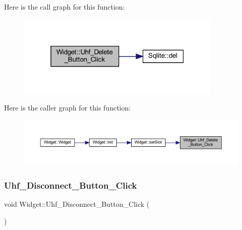 Here is the call graph for this function\+:
\nopagebreak
\begin{figure}[H]
\begin{center}
\leavevmode
\includegraphics[width=277pt]{class_widget_a6ef0cb76aab26c216bdd0584d32bdd1d_cgraph}
\end{center}
\end{figure}
Here is the caller graph for this function\+:
\nopagebreak
\begin{figure}[H]
\begin{center}
\leavevmode
\includegraphics[width=350pt]{class_widget_a6ef0cb76aab26c216bdd0584d32bdd1d_icgraph}
\end{center}
\end{figure}
\mbox{\label{class_widget_a0186f9125495a90a0166280d932ae831}} 
\subsubsection{\texorpdfstring{Uhf\_Disconnect\_Button\_Click}{Uhf\_Disconnect\_Button\_Click}}
{\footnotesize\ttfamily void Widget\+::\+Uhf\+\_\+\+Disconnect\+\_\+\+Button\+\_\+\+Click (\begin{DoxyParamCaption}{ }\end{DoxyParamCaption})\hspace{0.3cm}{\ttfamily [slot]}}

